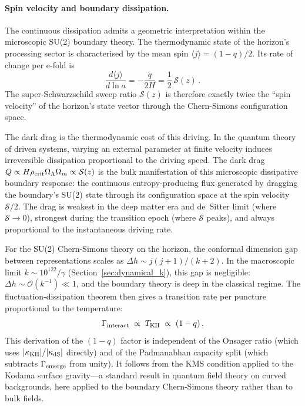 \documentclass[aps,prd,twocolumn,10pt,superscriptaddress,nofootinbib]{revtex4-2}
\begin{document}
\paragraph{Spin velocity and boundary dissipation.}

The continuous dissipation admits a geometric interpretation
within the microscopic SU(2) boundary theory.  The thermodynamic
state of the horizon's processing sector is characterised by the
mean spin $\langle j \rangle = (1-q)/2$.  Its rate of change per
e-fold is
\begin{equation}
\frac{d\langle j \rangle}{d\ln a}
  = -\frac{\dot{q}}{2H}
  = \frac{1}{2}\,\mathcal{S}(z)\,.
\label{eq:spin_velocity}
\end{equation}
The super-Schwarzschild sweep ratio $\mathcal{S}(z)$ is therefore
exactly twice the ``spin velocity'' of the horizon's state vector
through the Chern-Simons configuration space.

The dark drag is the thermodynamic cost of this driving.  In the
quantum theory of driven systems, varying an external parameter at
finite velocity induces irreversible dissipation proportional to
the driving speed.  The dark drag
$Q \propto H\rho_{\rm crit}\Omega_\Lambda\Omega_m \propto
\mathcal{S}(z)$ is the bulk manifestation of this microscopic
dissipative boundary response: the continuous entropy-producing flux generated by
dragging the boundary's SU(2) state through its configuration
space at the spin velocity $\mathcal{S}/2$.  The drag is weakest
in the deep matter era and de~Sitter limit (where
$\mathcal{S} \to 0$), strongest during the transition epoch
(where $\mathcal{S}$ peaks), and always proportional to the
instantaneous driving rate.

For the SU(2) Chern-Simons theory on the horizon, the conformal
dimension gap between representations scales as
$\Delta h \sim j(j+1)/(k+2)$.  In the macroscopic limit
$k \sim 10^{122}/\gamma$ (Section~\ref{sec:dynamical_k}), this
gap is negligible: $\Delta h \sim \mathcal{O}(k^{-1}) \ll 1$,
and the boundary theory
is deep in the classical regime.  The fluctuation-dissipation
theorem then gives a transition rate per puncture proportional to
the temperature:
\begin{equation}
\Gamma_{\rm interact} \;\propto\; T_{\rm KH} \;\propto\; (1-q)\,.
\label{eq:rate_interact}
\end{equation}
This derivation of the $(1-q)$ factor is independent of the
Onsager ratio (which uses $|\kappa_{\rm KH}|/|\kappa_{\rm dS}|$
directly) and of the Padmanabhan capacity split (which subtracts
$\Gamma_{\rm emerge}$ from unity).  It follows from the KMS
condition applied to the Kodama surface gravity---a standard result
in quantum field theory on curved backgrounds, here applied to
the boundary Chern-Simons theory rather than to bulk fields.
\end{document}
